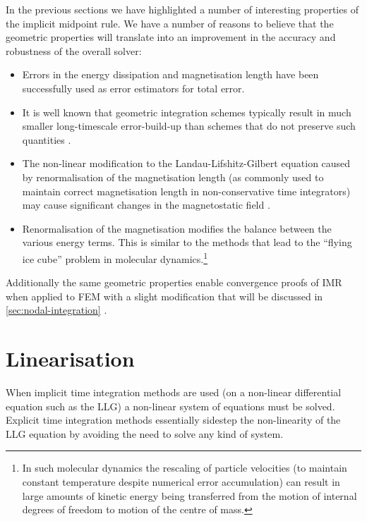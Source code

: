 In the previous sections we have highlighted a number of interesting properties of the implicit midpoint rule.
We have a number of reasons to believe that the geometric properties will translate into an improvement in the accuracy and robustness of the overall solver:
\begin{itemize}
\item Errors in the energy dissipation \cite{Albuquerque2001} and magnetisation length \cite{Chantrell2001} have been successfully used as error estimators for total error.
\item It is well known that geometric integration schemes typically result in much smaller long-timescale error-build-up than schemes that do not preserve such quantities \cite[77]{Iserles2009}.
\item The non-linear modification to the Landau-Lifshitz-Gilbert equation caused by renormalisation of the magnetisation length (as commonly used to maintain correct magnetisation length in non-conservative time integrators) may cause significant changes in the magnetostatic field \cite{Lewis2003}.
\item Renormalisation of the magnetisation modifies the balance between the various energy terms.
  This is similar to the methods that lead to the ``flying ice cube'' problem \cite{Harvey1998} in molecular dynamics.\footnote{In such molecular dynamics the rescaling of particle velocities (to maintain constant temperature despite numerical error accumulation) can result in large amounts of kinetic energy being transferred from the motion of internal degrees of freedom to motion of the centre of mass.}
\end{itemize}

Additionally the same geometric properties enable convergence proofs of IMR when applied to FEM with a slight modification that will be discussed in \cref{sec:nodal-integration} \cite{Bartels2006}.



\section{Linearisation}
\label{sec:linearisation}

When implicit time integration methods are used (on a non-linear differential equation such as the LLG) a non-linear system of equations must be solved.
Explicit time integration methods essentially sidestep the non-linearity of the LLG equation by avoiding the need to solve any kind of system.

